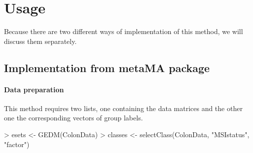 \documentclass[a4paper]{report}
\begin{document}
\section*{Usage}
Because there are two different ways of implementation of this method, we will discuss them separately.
\subsection*{Implementation from metaMA package}
\paragraph{Data preparation}
This method requires two lists, one containing the data matrices and the other one the corresponding vectors of group labels.
\begin{Schunk}
\begin{Sinput}
> esets <- GEDM(ColonData)
> classes <- selectClass(ColonData, "MSIstatus", "factor")
\end{Sinput}
\end{Schunk}
\end{document}
